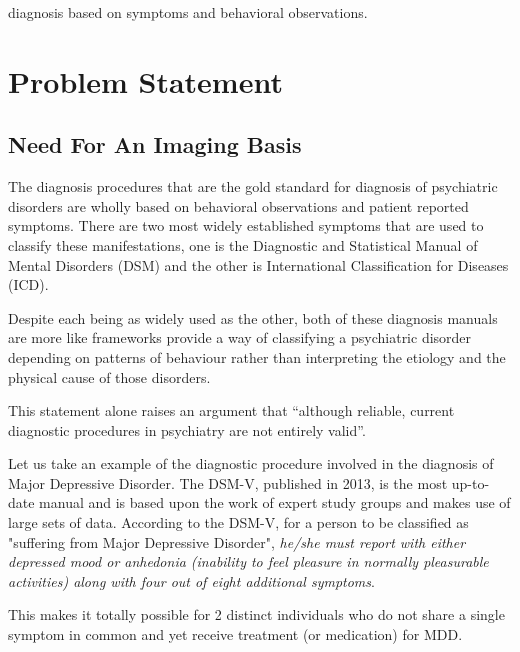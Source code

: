 \documentclass{article}
\begin{document}
diagnosis based on symptoms and behavioral observations.

\newpage

\section{Problem Statement}

\subsection{Need For An Imaging Basis}

The diagnosis procedures that are the gold standard for diagnosis of
psychiatric disorders are wholly based on behavioral observations and
patient reported symptoms. There are two most widely established
symptoms that are used to classify these manifestations, one is the
Diagnostic and Statistical Manual of Mental Disorders (DSM) and the
other is International Classification for Diseases (ICD).

Despite each being as widely used as the other, both of these
diagnosis manuals are more like frameworks provide a way of
classifying a psychiatric disorder depending on patterns of behaviour
rather than interpreting the etiology and the physical cause of those
disorders.

This statement alone raises an argument that ``although reliable,
current diagnostic procedures in psychiatry are not entirely valid''.

\iffalse
Reliable in the sense that any trained professional will arrive at
the same diagnosis for each patient.

Valid in the sense that it reflects the underlying psychological
and biological commonalities and differences among different
disorders to a certain extent. Validity continues to be more
difficult to achieve.
\fi

Let us take an example of the diagnostic procedure involved in the
diagnosis of Major Depressive Disorder. The DSM-V, published in 2013,
is the most up-to-date manual and is based upon the work of expert
study groups and makes use of large sets of data. According to the
DSM-V, for a person to be classified as "suffering from Major
Depressive Disorder", \textit{he/she must report with either depressed
mood or anhedonia (inability to feel pleasure in normally pleasurable
activities) along with four out of eight additional symptoms}.

This makes it totally possible for 2 distinct individuals who do not
share a single symptom in common and yet receive treatment (or
medication) for MDD.
\end{document}
